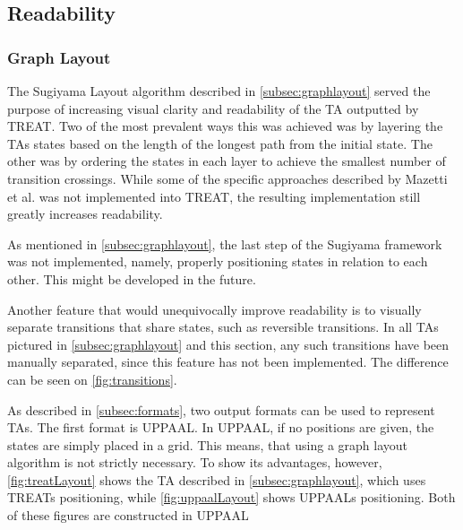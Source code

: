 \subsection{Readability}\label{subsec:readability}

\subsubsection{Graph Layout}
The Sugiyama Layout algorithm described in \cref{subsec:graphlayout} served the purpose of increasing visual clarity and readability of the TA outputted by TREAT.
Two of the most prevalent ways this was achieved was by layering the TAs states based on the length of the longest path from the initial state. The other was by ordering the states in each layer to achieve the smallest number of transition crossings.
While some of the specific approaches described by Mazetti et al. \cite{Mazetti2012} was not implemented into TREAT, the resulting implementation still greatly increases readability.

\vspace{.5\baselineskip plus 2pt}
As mentioned in \cref{subsec:graphlayout}, the last step of the Sugiyama framework was not implemented, namely, properly positioning states in relation to each other. This might be developed in the future.

\vspace{.5\baselineskip plus 2pt}
Another feature that would unequivocally improve readability is to visually separate transitions that share states, such as reversible transitions.
In all TAs pictured in \cref{subsec:graphlayout} and this section, any such transitions have been manually separated, since this feature has not been implemented. The difference can be seen on \cref{fig:transitions}.

\begin{center}
    
\end{center}
\vspace{0.75em}

As described in \cref{subsec:formats}, two output formats can be used to represent TAs.
The first format is UPPAAL. In UPPAAL, if no positions are given, the states are simply placed in a grid. This means, that using a graph layout algorithm is not strictly necessary.
To show its advantages, however, \cref{fig:treatLayout} shows the TA described in \cref{subsec:graphlayout}, which uses TREATs positioning, while \cref{fig:uppaalLayout} shows UPPAALs positioning. Both of these figures are constructed in UPPAAL

